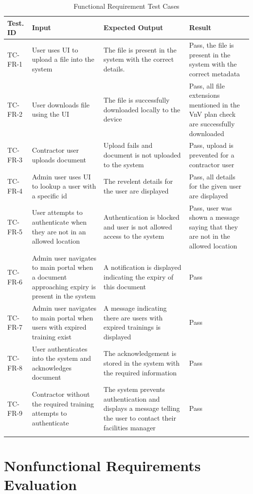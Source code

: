 \documentclass[12pt, titlepage]{article}
\begin{document}
\begin{longtable}{|m{1cm}|m{3cm}|m{5cm}|m{3cm}|}
  \hline
  \textbf{Test. ID} & \textbf{Input} & \textbf{Expected Output} &
  \textbf{Result} \\
  \hline
  TC-FR-1 & User uses UI to upload a file into the system & The file is
  present in the system with the correct details. & Pass, the file is
  present in the system with the correct metadata\\ \hline
  TC-FR-2 & User downloads file using the UI & The file is successfully
  downloaded locally to the device & Pass, all file extensions mentioned in the
  VnV plan check are successfully downloaded\\ \hline
  TC-FR-3 & Contractor user uploads document & Upload fails and document is not
  uploaded to the system & Pass, upload is prevented for a contractor
  user\\ \hline
  TC-FR-4 & Admin user uses UI to lookup a user with a specific id & The
  revelent details for the user are displayed & Pass, all details for
  the given user are displayed\\ \hline
  TC-FR-5 & User attempts to authenticate when they are not in an allowed
  location & Authentication is blocked and user is not allowed access to the
  system & Pass, user was shown a message saying that they are not in the
  allowed location\\ \hline
  TC-FR-6 & Admin user navigates to main portal when a document
  approaching expiry is present in the system & A notification is displayed
  indicating the expiry of this document &
  Pass\\ \hline
  TC-FR-7 & Admin user navigates to main portal when users with
  expired training exist & A message indicating there are users with
  expired trainings is displayed &
  Pass\\ \hline
  TC-FR-8 & User authenticates into the system and acknowledges
  document & The acknowledgement is stored in the system with the
  required information &
  Pass\\ \hline
  TC-FR-9 & Contractor without the required training attempts to
  authenticate & The system prevents authentication and displays a
  message telling the user to contact their facilities manager &
  Pass\\ \hline
  \caption{Functional Requirement Test Cases}
\end{longtable}

\section{Nonfunctional Requirements Evaluation}
\end{document}
